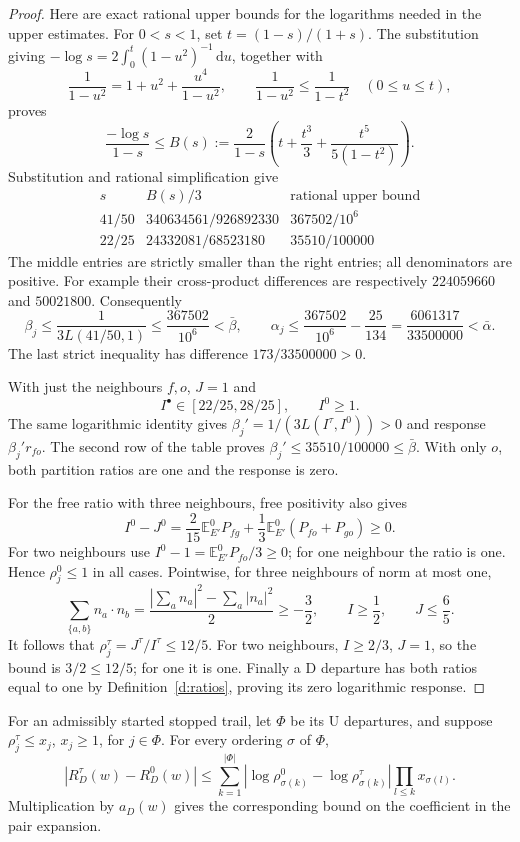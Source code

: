 \begin{proof}
Here are exact rational upper bounds for the logarithms needed in
the upper estimates. For \(0<s<1\), set \(t=(1-s)/(1+s)\).
The substitution giving
\(-\log s=2\int_0^t(1-u^2)^{-1}\,\mathrm du\), together with
\[
 \frac1{1-u^2}=1+u^2+\frac{u^4}{1-u^2},\qquad
 \frac1{1-u^2}\le\frac1{1-t^2}\quad(0\le u\le t),
\]
proves
\[
 \frac{-\log s}{1-s}\le
 B(s):=\frac2{1-s}
       \left(t+\frac{t^3}{3}+\frac{t^5}{5(1-t^2)}\right).
\]
Substitution and rational simplification give
\[
 \begin{array}{c|c|c}
 s&B(s)/3&\text{rational upper bound}\\ \hline
 41/50&340634561/926892330&367502/10^6\\
 22/25&24332081/68523180&35510/100000
 \end{array}
\]
The middle entries are strictly smaller than the right entries;
all denominators are positive. For example their cross-product
differences are respectively \(224059660\) and \(50021800\).
Consequently
\[
 \beta_j\le\frac1{3L(41/50,1)}
       \le\frac{367502}{10^6}<\bar\beta,\qquad
 \alpha_j\le\frac{367502}{10^6}-\frac{25}{134}
       =\frac{6061317}{33500000}<\bar\alpha.
\]
The last strict inequality has difference
\(173/33500000>0\).

With just the neighbours \(f,o\), \(J=1\) and
\[
 I^\bullet\in[22/25,28/25],\qquad I^0\ge1.
\]
The same logarithmic identity gives
\(\beta_j'=1/(3L(I^\tau,I^0))>0\) and response
\(\beta_j'r_{fo}\). The second row of the table proves
\(\beta_j'\le35510/100000\le\bar\beta\).
With only \(o\), both partition ratios are one and the response
is zero.

For the free ratio with three neighbours, free positivity also gives
\[
 I^0-J^0
 =\frac2{15}\mathbb E^0_{E'}P_{fg}
      +\frac13\mathbb E^0_{E'}(P_{fo}+P_{go})\ge0.
\]
For two neighbours use \(I^0-1=\mathbb E^0_{E'}P_{fo}/3\ge0\);
for one neighbour the ratio is one. Hence \(\rho_j^0\le1\)
in all cases. Pointwise, for three neighbours of norm at most one,
\[
 \sum_{\{a,b\}}n_a\cdot n_b
   =\frac{|\sum_a n_a|^2-\sum_a|n_a|^2}{2}\ge-\frac32,
 \qquad I\ge\frac12,\qquad J\le\frac65.
\]
It follows that \(\rho_j^\tau=J^\tau/I^\tau\le12/5\).
For two neighbours, \(I\ge2/3\), \(J=1\), so the bound is
\(3/2\le12/5\); for one it is one.
Finally a \(\mathrm D\) departure has both ratios equal to one
by Definition~\ref{d:ratios}, proving its zero logarithmic response.
\end{proof}

\begin{lemma}\label{l:exposure}
For an admissibly started stopped trail, let \(\Phi\) be its
\(\mathrm U\) departures, and suppose \(\rho_j^\tau\le x_j\),
\(x_j\ge1\), for \(j\in\Phi\).
For every ordering \(\sigma\) of \(\Phi\),
\[
 |R_D^\tau(w)-R_D^0(w)|
 \le\sum_{k=1}^{|\Phi|}
       |\log\rho_{\sigma(k)}^0-\log\rho_{\sigma(k)}^\tau|
                         \prod_{l\le k}x_{\sigma(l)}.
\]
Multiplication by \(a_D(w)\) gives the corresponding bound on the
coefficient in the pair expansion.
\end{lemma}

